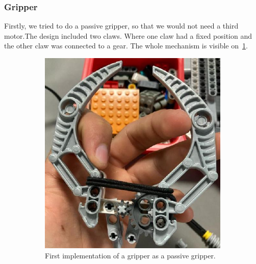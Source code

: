 \documentclass{article}
\begin{document}
\subsubsection*{Gripper}
\label{subsubsec:gripper}

Firstly, we tried to do a passive gripper, so that we would not need a third motor.The design included two claws. Where
one claw had a fixed position and the other claw was connected to a gear. The whole mechanism is visible
on~\ref{fig:gripper}.

\begin{figure}[!htbp]
	\centering
	\begin{subfigure}{0.4\textwidth}
		\includegraphics[width=\textwidth]{./figures/passiveGripper.jpeg}
		\caption{First implementation of a gripper as a passive gripper.}
		\label{fig:gripper}
	\end{subfigure}
	\hspace{0.01cm}
	\begin{subfigure}{0.4\textwidth}

\end{subfigure}
\end{figure}
\end{document}
